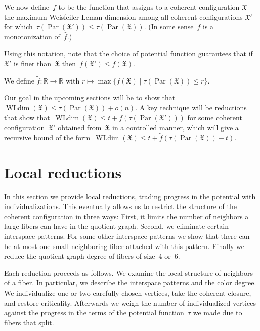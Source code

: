 \documentclass[english,a4paper]{article}
\theoremstyle{plain}
\theoremstyle{definition}
\newcommand{\Rel}{\ensuremath{\mathbb{R}}}
\newcommand{\coherentConfig}{\ensuremath{\mathfrak{X}}}
\DeclareMathOperator*{\WLdim}{WLdim}
\newcommand{\wldim}[1]{\ensuremath{\WLdim\left(#1\right)}}
\newcommand{\f}{f}
\DeclareMathOperator{\parameters}{Par}
\begin{document}
We now define~$\f$ to be the function that assigns to a coherent configuration $\coherentConfig$ the maximum Weisfeiler-Leman dimension among all coherent configurations $\coherentConfig'$ for which~$\tau(\parameters(\coherentConfig'))\leq \tau(\parameters(\coherentConfig))$. (In some sense~$f$ is a monotonization of~$\widehat{f}$.)

Using this notation, note that the choice of potential function guarantees that if~$\coherentConfig'$ is finer than~$\coherentConfig$ then~$\f(\coherentConfig')\leq \f(\coherentConfig)$.

We define $\widetilde{\f} \colon \Rel \longrightarrow \Rel$ with $r \mapsto \max \{ \f(\coherentConfig) \mid \tau (\parameters(\coherentConfig)) \leq r \}$.

Our goal in the upcoming sections will be to show that~$\wldim{\coherentConfig}\leq \tau(\parameters(\coherentConfig))+o(n)$. A key technique will be reductions that show that~$\wldim{\coherentConfig}\leq t+ \f(\tau (\parameters(\coherentConfig')))$ for some coherent configuration~$\coherentConfig'$ obtained from~$\coherentConfig$ in a controlled manner, which will give a recursive bound of the form~$\wldim{\coherentConfig}
 \leq t + \widetilde{f} (\tau(\parameters(\coherentConfig)) -t)$.     


\section{Local reductions}
\label{recursive-argement/sec}

In this section we provide local reductions,
trading progress in the potential with individualizations. This eventually allows us to restrict the structure of the coherent configuration in three ways:
First, it limits the number of neighbors a large fibers can have in the quotient graph.
Second, we eliminate certain interspace patterns. For some other interspace patterns we show that there  can be at most one small neighboring fiber attached with this pattern.
Finally we reduce the quotient graph degree of fibers of size~4 or~6.

Each reduction proceeds as follows.
We examine the local structure of neighbors of a fiber. In particular, we describe the interspace patterns and the color degree.
We individualize one or two carefully chosen vertices, take the coherent closure, and restore criticality.
Afterwards we weigh the number of individualized vertices against the progress in the terms of the potential function~$\tau$ we made due to fibers that split.
\end{document}
